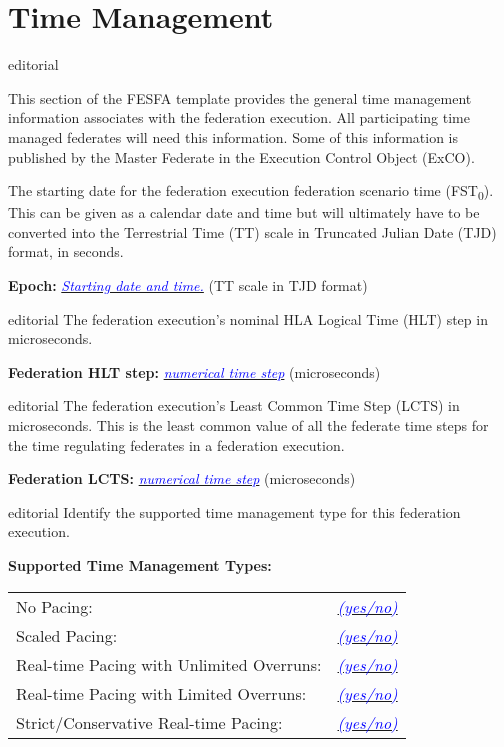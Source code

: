 \documentclass[11pt,english,letterpaper]{article}
\newcommand{\example}[1]{{\textcolor{blue}{\textit{#1}}}}
\begin{document}
\section*{Time Management}

\begin{shownto}{editorial}
{\color{red} This section of the FESFA template provides the general time
management information associates with the federation execution. All
participating time managed federates will need this information. Some of this
information is published by the Master Federate in the Execution Control Object
(ExCO).

The starting date for the federation execution federation scenario time (FST\textsubscript{0}).
This can be given as a calendar date and time but will ultimately have to be
converted into the Terrestrial Time (TT) scale in Truncated Julian Date (TJD)
format, in seconds.}
\end{shownto}

\textbf{Epoch: } \underline{\example{Starting date and time.}} (TT scale in TJD format)

\begin{shownto}{editorial}
{\color{red} The federation execution’s nominal HLA Logical Time (HLT) step in
microseconds.}
\end{shownto}

\textbf{Federation HLT step: } \underline{\example{numerical time step}} (microseconds)

\begin{shownto}{editorial}
{\color{red} The federation execution’s Least Common Time Step (LCTS) in
microseconds. This is the least common value of all the federate time steps for
the time regulating federates in a federation execution.}
\end{shownto}

\textbf{Federation LCTS: }  \underline{\example{numerical time step}} (microseconds)

\begin{shownto}{editorial}
{\color{red} Identify the supported time management type for this federation execution.}
\end{shownto}

\textbf{Supported Time Management Types: }

\hspace{0.25in}
\begin{tabular}{ll}
No Pacing:                                & \underline{\example{(yes/no)}} \\
Scaled Pacing:                            & \underline{\example{(yes/no)}} \\
Real-time Pacing with Unlimited Overruns: & \underline{\example{(yes/no)}} \\
Real-time Pacing with Limited Overruns:   & \underline{\example{(yes/no)}} \\
Strict/Conservative Real-time Pacing:     & \underline{\example{(yes/no)}} \\
\end{tabular}
\end{document}

